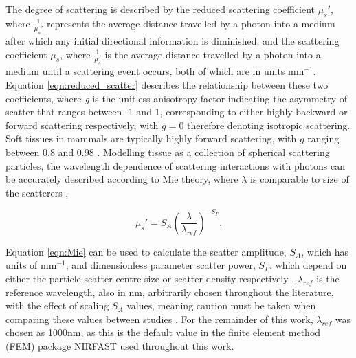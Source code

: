 \documentclass[twoside]{bhamthesis}
\theoremstyle{definition}
\begin{document}
The degree of scattering is described by the reduced scattering coefficient $\mu_s'$, where $\frac{1}{\mu_s'}$ represents the average distance travelled by a photon into a medium after which any initial directional information is diminished, and the scattering coefficient $\mu_s$, where $\frac{1}{\mu_s}$ is the average distance travelled by a photon into a medium until a scattering event occurs, both of which are in units mm$^{-1}$. Equation \ref{eqn:reduced_scatter} describes the relationship between these two coefficients, where \textit{g} is the unitless anisotropy factor indicating the asymmetry of scatter that ranges between -1 and 1, corresponding to either highly backward or forward scattering respectively, with $g=0$ therefore denoting isotropic scattering. Soft tissues in mammals are typically highly forward scattering, with $g$ ranging between 0.8 and 0.98 \cite{cheong1990review}. Modelling tissue as a collection of spherical scattering particles, the wavelength dependence of scattering interactions with photons can be accurately described according to Mie theory, where $\lambda$ is comparable to size of the scatterers  \cite{van1991light,mourant1997predictions},

\begin{equation}
\mu_s' = S_A \left(\frac{\lambda}{\lambda_{ref}}\right)^{-S_P}.
  \label{eqn:Mie}
\end{equation}

Equation \ref{eqn:Mie} can be used to calculate the scatter amplitude, $S_A$, which has units of $\mathrm{mm^{-1}}$, and dimensionless parameter scatter power, $S_P$, which depend on either the particle scatter centre size or scatter density respectively \cite{dehghani2009near}. $\lambda_{ref}$ is the reference wavelength, also in nm, arbitrarily chosen throughout the literature, with the effect of scaling $S_A$ values, meaning caution must be taken when comparing these values between studies \cite{jacques2013optical}. For the remainder of this work, $\lambda_{ref}$ was chosen as 1000nm, as this is the default value in the finite element method (FEM) package NIRFAST \cite{dehghani2009near} used throughout this work.

\end{document}
